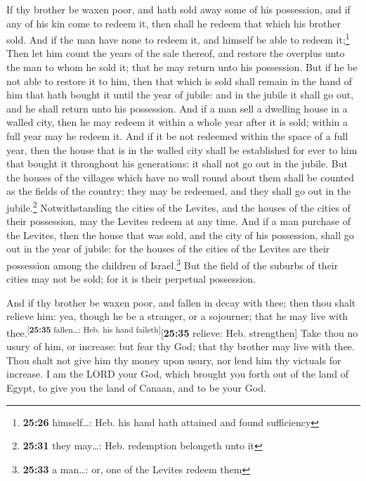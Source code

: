  If thy brother be waxen poor, and hath sold away some of
his possession, and if any of his kin come to redeem it, then shall he
redeem that which his brother sold.  And if the man have
none to redeem it, and himself be able to redeem it;\footnote{\textbf{25:26}
  himself\ldots: Heb. his hand hath attained and found sufficiency}
 Then let him count the years of the sale thereof, and
restore the overplus unto the man to whom he sold it; that he may return
unto his possession.  But if he be not able to restore it
to him, then that which is sold shall remain in the hand of him that
hath bought it until the year of jubile: and in the jubile it shall go
out, and he shall return unto his possession.  And if a
man sell a dwelling house in a walled city, then he may redeem it within
a whole year after it is sold; within a full year may he redeem it.
 And if it be not redeemed within the space of a full
year, then the house that is in the walled city shall be established for
ever to him that bought it throughout his generations: it shall not go
out in the jubile.  But the houses of the villages which
have no wall round about them shall be counted as the fields of the
country: they may be redeemed, and they shall go out in the
jubile.\footnote{\textbf{25:31} they may\ldots: Heb. redemption
  belongeth unto it}  Notwithstanding the cities of the
Levites, and the houses of the cities of their possession, may the
Levites redeem at any time.  And if a man purchase of the
Levites, then the house that was sold, and the city of his possession,
shall go out in the year of jubile: for the houses of the cities of the
Levites are their possession among the children of Israel.\footnote{\textbf{25:33}
  a man\ldots: or, one of the Levites redeem them}  But
the field of the suburbs of their cities may not be sold; for it is
their perpetual possession.

 And if thy brother be waxen poor, and fallen in decay
with thee; then thou shalt relieve him: yea, though he be a stranger, or
a sojourner; that he may live with
thee.\textsuperscript{{[}\textbf{25:35} fallen\ldots: Heb. his hand
faileth{]}}{[}\textbf{25:35} relieve: Heb. strengthen{]} 
Take thou no usury of him, or increase: but fear thy God; that thy
brother may live with thee.  Thou shalt not give him thy
money upon usury, nor lend him thy victuals for increase.
 I am the LORD your God, which brought you forth out of
the land of Egypt, to give you the land of Canaan, and to be your God.

